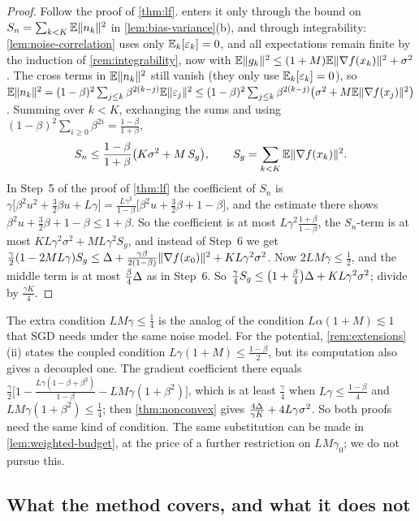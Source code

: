 \begin{proof}
Follow the proof of \cref{thm:lf}.  enters it only through the bound on
$S_n=\sum_{k<K}\mathbb{E}\lVert n_k\rVert^2$ in \cref{lem:bias-variance}(b), and through integrability:
\cref{lem:noise-correlation} uses only $\mathbb{E}_k[\varepsilon_k]=0$, and all expectations remain finite by
the induction of \cref{rem:integrability}, now with
$\mathbb{E}\lVert g_k\rVert^2\le(1+M)\mathbb{E}\lVert \nabla f(x_k)\rVert^2+\sigma^2$. The cross terms in $\mathbb{E}\lVert n_k\rVert^2$ still vanish (they only use
$\mathbb{E}_k[\varepsilon_k]=0$), so
$\mathbb{E}\lVert n_k\rVert^2=(1-\beta)^2\sum_{j\le k}\beta^{2(k-j)}\mathbb{E}\lVert \varepsilon_j\rVert^2\le(1-\beta)^2\sum_{j\le k}\beta^{2(k-j)}\bigl(\sigma^2+M\mathbb{E}\lVert \nabla f(x_j)\rVert^2\bigr)$.
Summing over $k<K$, exchanging the sums and using
$(1-\beta)^2\sum_{i\ge0}\beta^{2i}=\frac{1-\beta}{1+\beta}$,
\[
  S_n\le\frac{1-\beta}{1+\beta}\bigl(K\sigma^2+M\,S_g\bigr),\qquad S_g=\sum_{k<K}\mathbb{E}\lVert \nabla f(x_k)\rVert^2 .
\]
In Step~5 of the proof of \cref{thm:lf} the coefficient of $S_n$ is
$\gamma\bigl[\beta^2u^2+\frac32\beta u+L\gamma\bigr]=\frac{L\gamma^2}{1-\beta}\bigl[\beta^2u+\frac32\beta+1-\beta\bigr]$,
and the estimate there shows $\beta^2u+\frac32\beta+1-\beta\le1+\beta$. So the coefficient is at
most $L\gamma^2\frac{1+\beta}{1-\beta}$, the $S_n$-term is at most $KL\gamma^2\sigma^2+ML\gamma^2S_g$, and
instead of Step~6 we get
$\frac\gamma2(1-2ML\gamma)S_g\le\Delta+\frac{\gamma\beta}{2(1-\beta)}\lVert \nabla f(x_0)\rVert^2+KL\gamma^2\sigma^2$.
Now $2LM\gamma\le\frac12$, and the middle term is at most $\frac\beta4\Delta$ as in Step~6. So
$\frac\gamma4S_g\le\bigl(1+\frac\beta4\bigr)\Delta+KL\gamma^2\sigma^2$; divide by $\frac{\gamma K}{4}$.
\end{proof}

The extra condition $LM\gamma\le\frac14$ is the analog of the condition
$L\alpha(1+M)\lesssim1$ that SGD needs under the same noise model. For the potential,
\cref{rem:extensions}(ii) states the coupled condition $L\gamma(1+M)\le\frac{1-\beta}{2}$, but its
computation also gives a decoupled one. The gradient coefficient there equals
$\frac\gamma2\bigl[1-\frac{L\gamma(1-\beta+\beta^2)}{1-\beta}-LM\gamma(1+\beta^2)\bigr]$, which is at least
$\frac\gamma4$ when $L\gamma\le\frac{1-\beta}{4}$ and $LM\gamma(1+\beta^2)\le\frac14$; then
\cref{thm:nonconvex} gives $\frac{4\Delta}{\gamma K}+4L\gamma\sigma^2$. So both proofs need the same kind of
condition. The same substitution can be made in \cref{lem:weighted-budget}, at the price of a
further restriction on $LM\gamma_0$; we do not pursue this.

\subsection{What the method covers, and what it does not}\label{sec:lf-limits}

